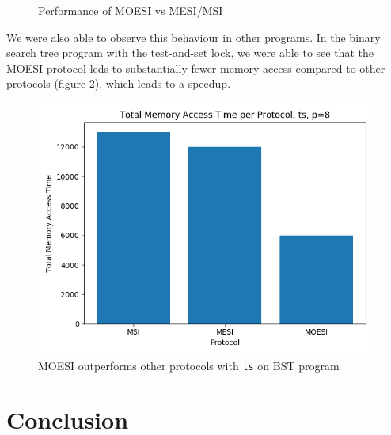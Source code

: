 \documentclass{article}
\def\inline{\lstinline[language=C++, basicstyle=\ttfamily]}
\begin{document}
\begin{figure}[H]%
    \centering
    \qquad
    \caption{Performance of MOESI vs MESI/MSI}
    \label{fig:moesi}
\end{figure}

We were also able to observe this behaviour in other programs.  In the binary search tree program with the test-and-set lock, we were able to see that the MOESI protocol leds to substantially fewer memory access compared to other protocols (figure \ref{fig:bst}), which leads to a speedup. %

\begin{figure}[h]
\centering
\includegraphics[width=.5\textwidth]{figures/bst_ts_mem_time.png}
\caption{MOESI outperforms other protocols with \inline{ts} on BST program}
\label{fig:bst}
\end{figure}

\section{Conclusion}
\end{document}
